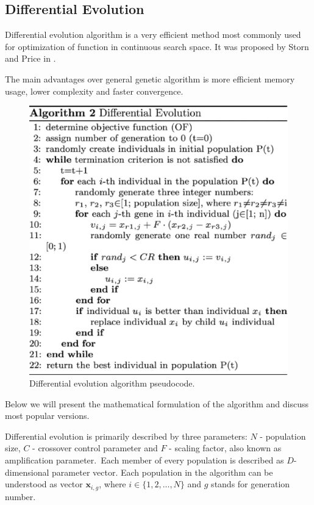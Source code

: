 \documentclass[11pt,a4paper,openany]{book}
\begin{document}
\subsection{Differential Evolution}

\noindent Differential evolution algorithm is a very efficient method most commonly used for optimization of function in continuous search space. It was proposed by Storn and Price in \cite{de}.

\noindent The main advantages over general genetic algorithm is more efficient memory usage, lower complexity and faster convergence.

 \begin{figure}[H]
     \centering
     \includegraphics[scale=0.5]{figs/diff-evo.eps}
     \caption{Differential evolution algorithm pseudocode. \cite{de}}\label{Fig:PROGAN}
 \end{figure}

\noindent Below we will present the mathematical formulation of the algorithm and discuss most popular versions.

\noindent Differential evolution is primarily described by three parameters: $N$ - population size, $C$ - crossover control parameter and $F$ - scaling factor, also known as amplification parameter.\
Each member of every population is described as $D$-dimensional parameter vector. Each population in the algorithm can be understood as vector $\textbf{x}_{i, g}$, where $i \in \{1, 2, ..., N\}$ and $g$ stands for generation number.
\end{document}

